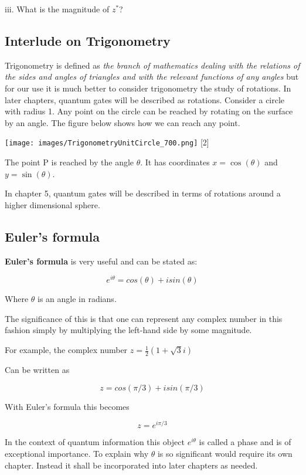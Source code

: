 \documentclass{book}
\begin{document}
iii. What is the magnitude of $z^*$?

\subsection{ Interlude on Trigonometry } 

Trigonometry is defined as \textit{the branch of mathematics dealing with the relations of the sides and angles of triangles and with the relevant functions of any angles} but for our use it is much better to consider trigonometry the study of rotations. In later chapters, quantum gates will be described as rotations. Consider a circle with radius 1. Any point on the circle can be reached by rotating on the surface by an angle. The figure below shows how we can reach any point.


\texttt{[image: images/TrigonometryUnitCircle\_700.png]}
[2]

The point P is reached by the angle $\theta$. It has coordinates $x = \cos(\theta)$ and $ y = \sin(\theta)$.

In chapter 5, quantum gates will be described in terms of rotations around a higher dimensional sphere. 

\subsection{ Euler's formula}

\textbf{Euler's formula} is very useful and can be stated as:

$$ e^{i \theta} = cos(\theta) + i sin(\theta) $$

Where $\theta$ is an angle in radians. 

The significance of this is that one can represent any complex number in this fashion simply by multiplying the left-hand side by some magnitude. 

For example, the complex number $ z = \frac{1}{2}( 1 + \sqrt{3}i)$ 

Can be written as 

$$ z = cos(\pi/3) + i sin(\pi/3) $$

With Euler's formula this becomes 

$$ z = e^{i \pi/3} $$

In the context of quantum information this object $ e^{i\theta}$ is called a phase and is of exceptional importance. To explain why $\theta$ is so significant would require its own chapter. Instead it shall be incorporated into later chapters as needed.
\end{document}
